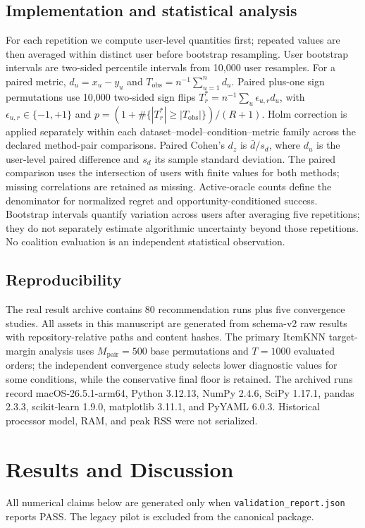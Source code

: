 \documentclass[pdflatex,sn-mathphys-num]{sn-jnl}
\begin{document}
\subsection{Implementation and statistical analysis}
For each repetition we compute user-level quantities first; repeated values are then averaged within distinct user before bootstrap resampling. User bootstrap intervals are two-sided percentile intervals from 10,000 user resamples. For a paired metric, $d_u=x_u-y_u$ and $T_{\mathrm{obs}}=n^{-1}\sum_{u=1}^{n}d_u$. Paired plus-one sign permutations use 10,000 two-sided sign flips $T_r^*=n^{-1}\sum_u\epsilon_{u,r}d_u$, with $\epsilon_{u,r}\in\{-1,+1\}$ and $p=(1+\#\{|T_r^*|\ge|T_{\mathrm{obs}}|\})/(R+1)$. Holm correction is applied separately within each dataset--model--condition--metric family across the declared method-pair comparisons. Paired Cohen's $d_z$ is $\bar d/s_d$, where $d_u$ is the user-level paired difference and $s_d$ its sample standard deviation. The paired comparison uses the intersection of users with finite values for both methods; missing correlations are retained as missing. Active-oracle counts define the denominator for normalized regret and opportunity-conditioned success. Bootstrap intervals quantify variation across users after averaging five repetitions; they do not separately estimate algorithmic uncertainty beyond those repetitions. No coalition evaluation is an independent statistical observation.

\subsection{Reproducibility}
The real result archive contains 80 recommendation runs plus five convergence studies. All assets in this manuscript are generated from schema-v2 raw results with repository-relative paths and content hashes. The primary ItemKNN target-margin analysis uses $M_{\mathrm{pair}}=500$ base permutations and $T=1000$ evaluated orders; the independent convergence study selects lower diagnostic values for some conditions, while the conservative final floor is retained. The archived runs record macOS-26.5.1-arm64, Python 3.12.13, NumPy 2.4.6, SciPy 1.17.1, pandas 2.3.3, scikit-learn 1.9.0, matplotlib 3.11.1, and PyYAML 6.0.3. Historical processor model, RAM, and peak RSS were not serialized.

\section{Results and Discussion}\label{sec:results}
All numerical claims below are generated only when \texttt{validation\_report.json} reports PASS. The legacy pilot is excluded from the canonical package.
\end{document}
